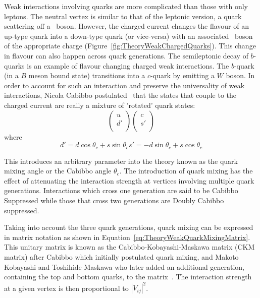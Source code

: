 Weak interactions involving quarks are more complicated than those with only leptons. The neutral vertex is similar to that of the leptonic version, a quark scattering off a \Z\ boson. However, the charged current changes the flavour of an up-type quark into a down-type quark (or vice-versa) with an associated \W\ boson of the appropriate charge (Figure~\ref{fig:TheoryWeakChargedQuarks}). This change in flavour can also happen across quark generations. The semileptonic decay of $b$-quarks is an example of flavour changing charged weak interactions. The $b$-quark (in a $B$ meson bound state) transitions into a $c$-quark by emitting a $W$ boson. In order to account for such an interaction and preserve the universality of weak interactions, Nicola Cabibbo postulated~\cite{Theory:CKMNicola} that the states that couple to the charged current are really a mixture of 'rotated' quark states:
%
\begin{equation}
  \begin{pmatrix}
    u \\
    d' \\
  \end{pmatrix}
  \begin{pmatrix}
    c \\
    s' \\
  \end{pmatrix}
\end{equation}
%
where
%
\begin{subequations}
  \begin{equation}
  \label{eq:TheoryWeakQuarkMixingEq1}
  d'=d\cos\theta_{c} + s\sin\theta_{c}
  \end{equation}
  \begin{equation}
  \label{eq:TheoryWeakQuarkMixingEq2}
  s'=-d\sin\theta_{c} + s\cos\theta_{c}
  \end{equation}
\end{subequations}

This introduces an arbitrary parameter into the theory known as the quark mixing angle or the Cabibbo angle $\theta_{c}$. The introduction of quark mixing has the effect of attenuating the interaction strength at vertices involving multiple quark generations. Interactions which cross one generation are said to be Cabibbo Suppressed while those that cross two generations are Doubly Cabibbo suppressed.

Taking into account the three quark generations, quark mixing can be expressed in matrix notation as shown in Equation~\ref{eq:TheoryWeakQuarkMixingMatrix}. This unitary matrix is known as the Cabibbo-Kobayashi-Maskawa matrix (CKM matrix) after Cabibbo which initially postulated quark mixing, and Makoto Kobayashi and Toshihide Maskawa who later added an additional generation, containing the top and bottom quarks, to the matrix~\cite{Theory:CKMKobayashiMaskawa}. The interaction strength at a given vertex is then proportional to $|V_{ij}|^{2}$.

